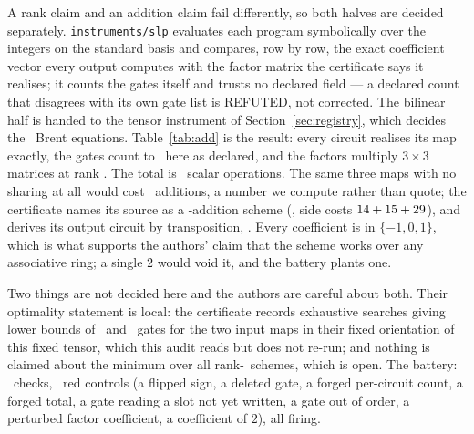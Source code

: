 \documentclass[11pt]{article}
\begin{document}
A rank claim and an addition claim fail differently, so both halves are decided separately.
\texttt{instruments/slp} evaluates each program symbolically over the integers on the standard basis and
compares, row by row, the exact coefficient vector every output computes with the factor matrix the
certificate says it realises; it counts the gates itself and trusts no declared field --- a declared count
that disagrees with its own gate list is REFUTED, not corrected. The bilinear half is handed to the tensor
instrument of Section~\ref{sec:registry}, which decides the \AddBrent\ Brent equations. Table~\ref{tab:add}
is the result: every circuit realises its map exactly, the gates count to \AddCounted\ here as declared,
and the factors multiply $3\times3$ matrices at rank \AddRank. The total is \AddScalarOps\ scalar
operations. The same three maps with no sharing at all would cost \AddNaive\ additions, a number we compute
rather than quote; the certificate names its source as a \AddSourceDeclared-addition scheme
(\AddSourcePath, side costs $14+15+29$), and derives its output circuit by
transposition, \AddTransposition. Every coefficient is in $\{-1,0,1\}$, which is what supports the
authors' claim that the scheme works over any associative ring; a single $2$ would void it, and the battery
plants one.

\begin{table}[h]\centering\small
{}
\caption{The three linear maps of the \AddCounted-addition certificate, each decided on its own. ``No
sharing'' is the cost of the same map with no common subexpressions.}\label{tab:add}
\end{table}

Two things are not decided here and the authors are careful about both. Their optimality statement is
local: the certificate records exhaustive searches giving lower bounds of \AddLocalLBU\ and \AddLocalLBV\
gates for the two input maps in their fixed orientation of this fixed tensor, which this audit reads but
does not re-run; and nothing is claimed about the minimum over all rank-\AddRank\ schemes, which is open.
The battery: \SlpBatteryChecks\ checks, \SlpBatteryReds\ red controls (a flipped sign, a deleted gate, a
forged per-circuit count, a forged total, a gate reading a slot not yet written, a gate out of order, a
perturbed factor coefficient, a coefficient of $2$), all firing.
\end{document}

